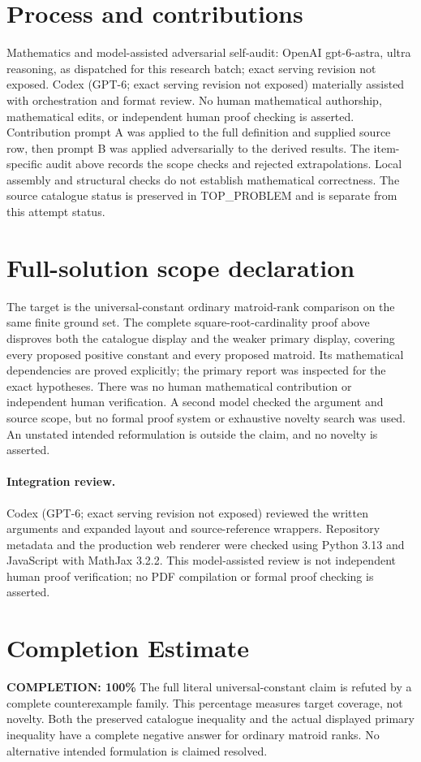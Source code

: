 \documentclass[11pt]{article}
\begin{document}
\section{Process and contributions}
Mathematics and model-assisted adversarial self-audit: OpenAI gpt-6-astra, ultra reasoning, as dispatched for this research batch; exact serving revision not exposed. Codex (GPT-6; exact serving revision not exposed) materially assisted with orchestration and format review. No human mathematical authorship, mathematical edits, or independent human proof checking is asserted.
Contribution prompt A was applied to the full definition and supplied source row, then prompt B was applied adversarially to the derived results. The item-specific audit above records the scope checks and rejected extrapolations. Local assembly and structural checks do not establish mathematical correctness. The source catalogue status is preserved in TOP\_PROBLEM and is separate from this attempt status.
\section{Full-solution scope declaration}
The target is the universal-constant ordinary matroid-rank comparison on the same finite ground set. The complete square-root-cardinality proof above disproves both the catalogue display and the weaker primary display, covering every proposed positive constant and every proposed matroid. Its mathematical dependencies are proved explicitly; the primary report was inspected for the exact hypotheses. There was no human mathematical contribution or independent human verification. A second model checked the argument and source scope, but no formal proof system or exhaustive novelty search was used. An unstated intended reformulation is outside the claim, and no novelty is asserted.
\paragraph{Integration review.} Codex (GPT-6; exact serving revision not exposed) reviewed the written arguments and expanded layout and source-reference wrappers. Repository metadata and the production web renderer were checked using Python 3.13 and JavaScript with MathJax 3.2.2. This model-assisted review is not independent human proof verification; no PDF compilation or formal proof checking is asserted.

\section{Completion Estimate}
\noindent\textbf{COMPLETION: 100\%}
The full literal universal-constant claim is refuted by a complete counterexample family. This percentage measures target coverage, not novelty. Both the preserved catalogue inequality and the actual displayed primary inequality have a complete negative answer for ordinary matroid ranks. No alternative intended formulation is claimed resolved.
\end{document}
